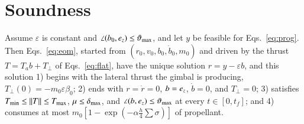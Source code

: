 \section{Soundness}\label{sec:proof}
\begin{theorem}\label{thm:sound}
Assume $\varepsilon$ is constant and $\angle(b_0,e_z)\le\vartheta_{\max}$, and let $y$ be feasible for Eqs.~\eqref{eq:prog}. Then
Eqs.~\eqref{eq:eom}, started from $(r_0,v_0,b_0,\dot b_0,m_0)$ and driven by the thrust $T=T_ab+T_\perp$ of
Eqs.~\eqref{eq:flat}, have the unique solution $r=y-\varepsilon b$, and this solution 1) begins with the lateral thrust the
gimbal is producing, $T_\perp(0)=-m_0\varepsilon\beta_0$; 2) ends with $r=\dot r=0$, $b=e_z$, $\dot b=0$, and $T_\perp=0$;
3) satisfies $T_{\min}\le\lVert T\rVert\le T_{\max}$, $\mu\le\delta_{\max}$, and $\angle(b,e_z)\le\vartheta_{\max}$ at every $t\in[0,t_f]$; and
4) consumes at most $m_0[1-\exp(-\alpha\tfrac h4\sum\sigma)]$ of propellant.
\end{theorem}
